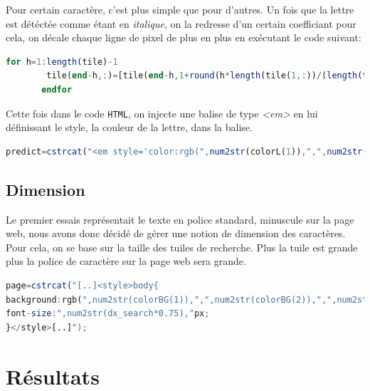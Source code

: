 \documentclass[a4paper,12pt,titlepage]{report}
\begin{document}
	Pour certain caractère, c'est plus simple que pour d'autres.
	Un fois que la lettre est détéctée comme étant en \textit{italique}, on la redresse d'un certain coefficiant pour cela, on décale chaque ligne de pixel de plus en plus en exécutant le code suivant:
	\begin{lstlisting}[caption={Redressage de caractère dans Octave},language=Octave]
 for h=1:length(tile)-1
        tile(end-h,:)=[tile(end-h,1+round(h*length(tile(1,:))/(length(tile)*4.1)):end) tile(end-h,1:round(h*length(tile(1,:))/(length(tile)*4.1)))];
       endfor
\end{lstlisting}
		Cette fois dans le code \texttt{HTML}, on injecte une balise de type \textsl{<em>} en lui définissant le style, la couleur de la lettre, dans la balise.
\begin{lstlisting}[caption={Insertion d'un caractère italique dans Octave},language=Octave]
 predict=cstrcat("<em style='color:rgb(",num2str(colorL(1)),",",num2str(colorL(2)),",",num2str(colorL(3)),");'>",predict,"</em>");
\end{lstlisting}
		
	\subsection{Dimension}
	Le premier essais représentait le texte en police standard, minuscule sur la page web, nous avons donc décidé de gérer une notion de dimension des caractères. Pour cela, on se base sur la taille des tuiles de recherche. Plus la tuile est grande plus la police de caractère sur la page web sera grande.
\begin{lstlisting}[caption={Insertion de la couleur de fond dans Octave},language=Octave]
page=cstrcat("[..]<style>body{
background:rgb(",num2str(colorBG(1)),",",num2str(colorBG(2)),",",num2str(colorBG(3)),");
font-size:",num2str(dx_search*0.75),"px;
}</style>[..]");
\end{lstlisting}
	\section{Résultats}
\end{document}
